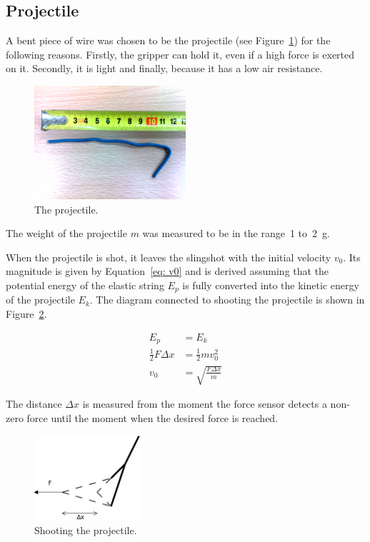 	
		\subsection{Projectile}
			A bent piece of wire was chosen to be the projectile (see Figure~\ref{fig: projectile}) for the following reasons. Firstly, the gripper can hold it, even if a high force is exerted on it. Secondly, it is light and finally, because it has a low air resistance.

			\begin{figure}[h]
			\includegraphics[width=0.5\textwidth]{bulletAdj.png}			
			\centering
			\caption{The projectile.}
			\label{fig: projectile}
			\end{figure}
			
			The weight of the projectile $m$ was measured to be in the range~1 to~\SI{2}{g}.
			
			When the projectile is shot, it leaves the slingshot with the initial velocity $ v_0$. Its magnitude is given by Equation~\eqref{eq: v0} and is derived assuming that the potential energy of the elastic string $ E_p$ is fully converted into the kinetic energy of the projectile $ E_k$. The diagram connected to shooting the projectile is shown in Figure~\ref{fig: shooting projectile}.
			
\begin{align}
E_p & = E_k \\[1ex]
%
\frac{1}{2}F \Delta x & = \frac{1}{2} m v_0^2 \nonumber \\[1ex]
%
v_0 & = \sqrt{\frac{F \Delta x}{m}}
\label{eq: v0}
\end{align}	
			
			The distance $ \Delta x$ is measured from the moment the force sensor detects a non-zero force until the moment when the desired force is reached.
			
			\begin{figure}
			\includegraphics[width=0.35\textwidth]{force.png}			
			\centering
			\caption{Shooting the projectile.}
			\label{fig: shooting projectile}
			\end{figure}

